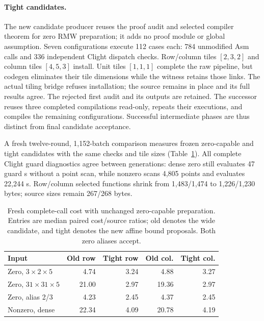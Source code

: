 \paragraph{Tight candidates.}
The new candidate producer reuses the proof audit and selected compiler theorem
for zero RMW preparation; it adds no proof module or global assumption.
Seven configurations execute 112 cases each: 784 unmodified Asm calls and 336
independent Clight dispatch checks. Row/column tiles $[2,3,2]$ and column tiles
$[4,5,3]$ install. Unit tiles $[1,1,1]$ complete the raw pipeline, but codegen
eliminates their tile dimensions while the witness retains those links. The
actual tiling bridge refuses installation; the source remains in place and
its full results agree. The rejected first audit and its outputs are retained.
The successor reuses three completed compilations read-only, repeats their
executions, and compiles the remaining configurations. Successful intermediate
phases are thus distinct from final candidate acceptance.

A fresh twelve-round, 1,152-batch comparison measures frozen zero-capable and
tight candidates with the same checks and tile sizes (Table~\ref{tab:tight-cost}).
All complete Clight guard diagnostics agree between generations: dense zero
still evaluates 47 guard s without a point scan, while nonzero scans
4,805 points and evaluates 22,244 s. Row/column selected functions
shrink from 1,483/1,474 to 1,226/1,230 bytes; source sizes remain 267/268 bytes.

\begin{table}[t]
\centering
\caption{Fresh complete-call cost with unchanged zero-capable preparation.
Entries are median paired cost/source ratios; old denotes the wide candidate,
and tight denotes the new affine bound proposals. Both zero aliases accept.}
\label{tab:tight-cost}
\begin{tabular}{lrrrr}
\toprule
Input & Old row & Tight row & Old col. & Tight col. \\
\midrule
Zero, $3\times2\times5$ & 4.74 & 3.24 & 4.88 & 3.27 \\
Zero, $31\times31\times5$ & 21.00 & 2.97 & 19.36 & 2.97 \\
Zero, alias 2/3 & 4.23 & 2.45 & 4.37 & 2.45 \\
Nonzero, dense & 22.34 & 4.09 & 20.78 & 4.19 \\
\bottomrule
\end{tabular}
\end{table}

